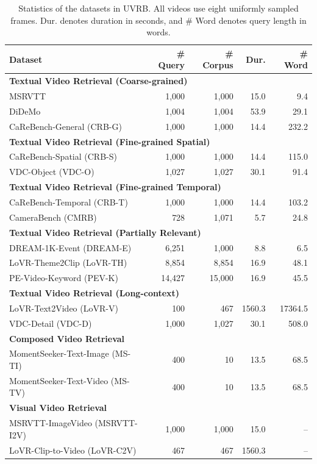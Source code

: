\begin{table}[t]
\centering
\caption{Statistics of the datasets in UVRB. All videos use eight uniformly sampled frames. Dur. denotes duration in seconds, and \# Word denotes query length in words.}
\label{gve:tab:uvrb_dataset}
\begin{tabular}{l r r r r}
\toprule
\textbf{Dataset} & \textbf{\# Query} & \textbf{\# Corpus} & \textbf{Dur.} & \textbf{\# Word} \\
\midrule
\multicolumn{5}{l}{\textbf{Textual Video Retrieval (Coarse-grained)}} \\
MSRVTT~\cite{xu2016msr} & 1,000 & 1,000 & 15.0 & 9.4 \\
DiDeMo~\cite{anne2017localizing} & 1,004 & 1,004 & 53.9 & 29.1 \\
CaReBench-General (CRB-G)~\cite{xu2025carebench} & 1,000 & 1,000 & 14.4 & 232.2 \\
\midrule
\multicolumn{5}{l}{\textbf{Textual Video Retrieval (Fine-grained Spatial)}} \\
CaReBench-Spatial (CRB-S)~\cite{xu2025carebench} & 1,000 & 1,000 & 14.4 & 115.0 \\
VDC-Object (VDC-O)~\cite{chai2024auroracap} & 1,027 & 1,027 & 30.1 & 91.4 \\
\multicolumn{5}{l}{\textbf{Textual Video Retrieval (Fine-grained Temporal)}} \\
CaReBench-Temporal (CRB-T)~\cite{xu2025carebench} & 1,000 & 1,000 & 14.4 & 103.2 \\
CameraBench (CMRB)~\cite{lin2025towards} & 728 & 1,071 & 5.7 & 24.8 \\
\multicolumn{5}{l}{\textbf{Textual Video Retrieval (Partially Relevant)}} \\
DREAM-1K-Event (DREAM-E)~\cite{wang2024tarsier} & 6,251 & 1,000 & 8.8 & 6.5 \\
LoVR-Theme2Clip (LoVR-TH)~\cite{cai2025lovr} & 8,854 & 8,854 & 16.9 & 48.1 \\
PE-Video-Keyword (PEV-K)~\cite{bolya2025perception} & 14,427 & 15,000 & 16.9 & 45.5 \\
\midrule
\multicolumn{5}{l}{\textbf{Textual Video Retrieval (Long-context)}} \\
LoVR-Text2Video (LoVR-V)~\cite{cai2025lovr} & 100 & 467 & 1560.3 & 17364.5 \\
VDC-Detail (VDC-D)~\cite{chai2024auroracap} & 1,000 & 1,027 & 30.1 & 508.0 \\
\midrule
\multicolumn{5}{l}{\textbf{Composed Video Retrieval}} \\
MomentSeeker-Text-Image (MS-TI)~\cite{yuan2025momentseeker} & 400 & 10 & 13.5 & 68.5 \\
MomentSeeker-Text-Video (MS-TV)~\cite{yuan2025momentseeker} & 400 & 10 & 13.5 & 68.5 \\
\midrule
\multicolumn{5}{l}{\textbf{Visual Video Retrieval}} \\
MSRVTT-ImageVideo (MSRVTT-I2V)~\cite{xu2016msr} & 1,000 & 1,000 & 15.0 & -- \\
LoVR-Clip-to-Video (LoVR-C2V)~\cite{cai2025lovr} & 467 & 467 & 1560.3 & -- \\
\bottomrule
\end{tabular}
\end{table}

